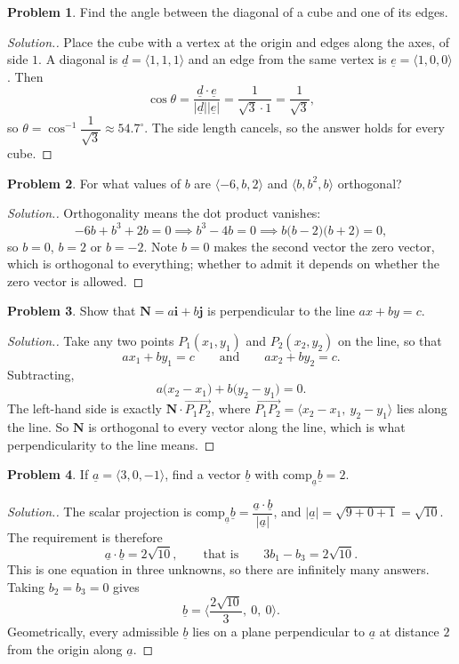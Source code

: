 \documentclass[11pt,a4paper]{article}
\theoremstyle{definition}
\newtheorem{problemx}{Problem}[subsection]
\newenvironment{problem}{\begin{problemx}}{\end{problemx}}
\newenvironment{solution}
  {\renewcommand{\qedsymbol}{}\begin{proof}[\textit{Solution}.]}
  {\end{proof}}
\begin{document}
\begin{problem}
Find the angle between the diagonal of a cube and one of its edges.
\end{problem}
\begin{solution}
Place the cube with a vertex at the origin and edges along the axes, of side
$1$. A diagonal is $\underline{d} = \langle 1,1,1\rangle$ and an edge from the
same vertex is $\underline{e} = \langle 1,0,0\rangle$. Then
$$\cos\theta = \frac{\underline{d}\cdot\underline{e}}
{\left|\underline{d}\right|\left|\underline{e}\right|}
= \frac{1}{\sqrt3\cdot 1} = \frac{1}{\sqrt3},$$
so $\theta = \cos^{-1}\dfrac{1}{\sqrt3}\approx 54.7^{\circ}$. The side length
cancels, so the answer holds for every cube.
\end{solution}

\begin{problem}
For what values of $b$ are $\langle -6, b, 2\rangle$ and
$\langle b, b^2, b\rangle$ orthogonal?
\end{problem}
\begin{solution}
Orthogonality means the dot product vanishes:
$$-6b + b^3 + 2b = 0 \implies b^3 - 4b = 0 \implies b\big(b-2\big)\big(b+2\big) = 0 ,$$
so $b = 0$, $b = 2$ or $b = -2$. Note $b=0$ makes the second vector the zero
vector, which is orthogonal to everything; whether to admit it depends on
whether the zero vector is allowed.
\end{solution}

\begin{problem}
Show that $\textbf{N} = a\textbf{i} + b\textbf{j}$ is perpendicular to the line
$ax+by = c$.
\end{problem}
\begin{solution}
Take any two points $P_1(x_1,y_1)$ and $P_2(x_2,y_2)$ on the line, so that
$$ax_1+by_1 = c \qquad\text{and}\qquad ax_2+by_2 = c .$$
Subtracting,
$$a\big(x_2-x_1\big) + b\big(y_2-y_1\big) = 0 .$$
The left-hand side is exactly
$\textbf{N}\cdot\overrightarrow{P_1P_2}$, where
$\overrightarrow{P_1P_2} = \langle x_2-x_1,\ y_2-y_1\rangle$ lies along the
line. So $\textbf{N}$ is orthogonal to every vector along the line, which is
what perpendicularity to the line means.
\end{solution}

\begin{problem}
If $\underline{a} = \langle 3,0,-1\rangle$, find a vector $\underline{b}$ with
$\text{comp}_{\underline{a}}\underline{b} = 2$.
\end{problem}
\begin{solution}
The scalar projection is
$\text{comp}_{\underline{a}}\underline{b}
= \dfrac{\underline{a}\cdot\underline{b}}{\left|\underline{a}\right|}$, and
$\left|\underline{a}\right| = \sqrt{9+0+1} = \sqrt{10}$. The requirement is
therefore
$$\underline{a}\cdot\underline{b} = 2\sqrt{10}, \qquad\text{that is}\qquad
3b_1 - b_3 = 2\sqrt{10}.$$
This is one equation in three unknowns, so there are infinitely many answers.
Taking $b_2 = b_3 = 0$ gives
$$\underline{b} = \Big\langle \frac{2\sqrt{10}}{3},\ 0,\ 0\Big\rangle .$$
Geometrically, every admissible $\underline{b}$ lies on a plane perpendicular to
$\underline{a}$ at distance $2$ from the origin along $\underline{a}$.
\end{solution}
\end{document}
